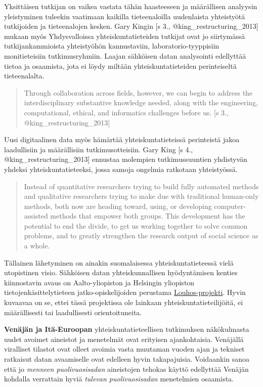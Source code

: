 Yksittäisen tutkijan on vaikea vastata tähän haasteeseen ja määrällisen
analyysin yleistyminen tuleekin vaatimaan kaikilla tieteenaloilla
uudenlaista yhteistyötä tutkijoiden ja tieteenalojen kesken. Gary Kingin
{[}s 3., @king\_restructuring\_2013{]} mukaan myös Yhdysvalloissa
yhteiskuntatieteiden tutkijat ovat jo siirtymässä tutkijankammioista
yhteistyöhön kannustaviin, laboratorio-tyyppisiin monitieteisiin
tutkimusryhmiin. Laajan sähköisen datan analysointi edellyttää tietoa ja
osaamista, jota ei löydy miltään yhteiskuntatieteiden perinteiseltä
tieteenalalta.

\begin{quote}
Through collaboration across fields, however, we can begin to address
the interdisciplinary substantive knowledge needed, along with the
engineering, computational, ethical, and informatics challenges before
us. {[}s 3., @king\_restructuring\_2013{]}
\end{quote}

Uusi digitaalinen data myös hämärtää yhteiskuntatieteissä perinteistä
jakoa laadullisiin ja määrällisiin tutkimusotteisiin. Gary King {[}s 4.,
@king\_restructuring\_2013{]} ennustaa molempien tutkimussuuntien
yhdistyvän yhdeksi yhteiskuntatieteeksi, jossa samoja ongelmia ratkotaan
yhteistyössä.

\begin{quote}
Instead of quantitative researchers trying to build fully automated
methods and qualitative researchers trying to make due with traditional
human-only methods, both now are heading toward, using, or developing
computer-assisted methods that empower both groups. This development has
the potential to end the divide, to get us working together to solve
common problems, and to greatly strengthen the research output of social
science as a whole.
\end{quote}

Tällainen lähetyminen on ainakin suomalaisessa yhteiskuntatieteessä
vielä utopistinen visio. Sähköisen datan yhteiskunnallisen hyödyntämisen
kenties kiinnostavin avaus on Aalto-yliopiston ja Helsingin yliopiston
tietojenkäsittelytieteen jatko-opiskelijoiden perustama
\href{http://louhos.github.com/}{Louhos-projekti}. Hyvin kuvaavaa on se,
ettei tässä projektissa ole lainkaan yhteiskuntatieteilijöitä, ei
määrällisesti tai laadullisesti orientoituneita.

\textbf{Venäjän ja Itä-Euroopan} yhteiskuntatieteellisen tutkimuksen
näkökulmasta uudet avoimet aineistot ja menetelmät ovat erityisen
ajankohtaisia. Venäjällä viralliset tilastot ovat olleet avoimia vasta
muutaman vuoden ajan ja tekniset ratkaisut datan avaamiselle ovat
edelleen hyvin takapajuisia. Voidaankin sanoa että jo \emph{menneen
puolivuosisadan} aineistojen tehokas käyttö edellyttää Venäjän kohdalla
verrattain hyviä \emph{tulevan puolivuosisadan} menetelmien osaamista.

